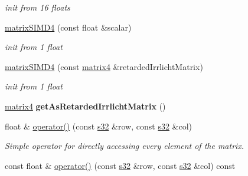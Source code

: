 \begin{DoxyCompactItemize}
\begin{DoxyCompactList}\small\item\em init from 16 floats \end{DoxyCompactList}\item 
\hyperlink{classirr_1_1core_1_1matrixSIMD4_a98fc07a74b54f6fafbfd9ed5bd259d56}{matrix\+S\+I\+M\+D4} (const float \&scalar)\hypertarget{classirr_1_1core_1_1matrixSIMD4_a98fc07a74b54f6fafbfd9ed5bd259d56}{}\label{classirr_1_1core_1_1matrixSIMD4_a98fc07a74b54f6fafbfd9ed5bd259d56}

\begin{DoxyCompactList}\small\item\em init from 1 float \end{DoxyCompactList}\item 
\hyperlink{classirr_1_1core_1_1matrixSIMD4_a707e8a72f09f2272109b002d8fad6d8b}{matrix\+S\+I\+M\+D4} (const \hyperlink{namespaceirr_1_1core_a73fa92e638c5ca97efd72da307cc9b65}{matrix4} \&retarded\+Irrlicht\+Matrix)\hypertarget{classirr_1_1core_1_1matrixSIMD4_a707e8a72f09f2272109b002d8fad6d8b}{}\label{classirr_1_1core_1_1matrixSIMD4_a707e8a72f09f2272109b002d8fad6d8b}

\begin{DoxyCompactList}\small\item\em init from 1 float \end{DoxyCompactList}\item 
\hyperlink{namespaceirr_1_1core_a73fa92e638c5ca97efd72da307cc9b65}{matrix4} {\bfseries get\+As\+Retarded\+Irrlicht\+Matrix} ()\hypertarget{classirr_1_1core_1_1matrixSIMD4_a7f136ef3d4ba5136cbc770fdbc6abf81}{}\label{classirr_1_1core_1_1matrixSIMD4_a7f136ef3d4ba5136cbc770fdbc6abf81}

\item 
float \& \hyperlink{classirr_1_1core_1_1matrixSIMD4_aa20c863a0ad035b4ee91f055d2208af7}{operator()} (const \hyperlink{namespaceirr_ac66849b7a6ed16e30ebede579f9b47c6}{s32} \&row, const \hyperlink{namespaceirr_ac66849b7a6ed16e30ebede579f9b47c6}{s32} \&col)\hypertarget{classirr_1_1core_1_1matrixSIMD4_aa20c863a0ad035b4ee91f055d2208af7}{}\label{classirr_1_1core_1_1matrixSIMD4_aa20c863a0ad035b4ee91f055d2208af7}

\begin{DoxyCompactList}\small\item\em Simple operator for directly accessing every element of the matrix. \end{DoxyCompactList}\item 
const float \& \hyperlink{classirr_1_1core_1_1matrixSIMD4_a7dfe15d7cd2627ccc519175401ffdb34}{operator()} (const \hyperlink{namespaceirr_ac66849b7a6ed16e30ebede579f9b47c6}{s32} \&row, const \hyperlink{namespaceirr_ac66849b7a6ed16e30ebede579f9b47c6}{s32} \&col) const \hypertarget{classirr_1_1core_1_1matrixSIMD4_a7dfe15d7cd2627ccc519175401ffdb34}{}\label{classirr_1_1core_1_1matrixSIMD4_a7dfe15d7cd2627ccc519175401ffdb34}


\end{DoxyCompactItemize}
